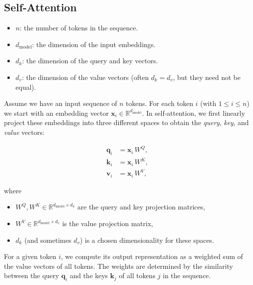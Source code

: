
\subsection{Self-Attention}

\begin{itemize}
	\item \( n \): the number of tokens in the sequence.
	\item \( d_{\text{model}} \): the dimension of the input embeddings.
	\item \( d_k \): the dimension of the query and key vectors.
	\item \( d_v \): the dimension of the value vectors (often \( d_k = d_v \), but they need not be equal).
\end{itemize}

Assume we have an input sequence of \( n \) tokens. For each token \( i \) (with \( 1 \leq i \leq n \)) we start with an embedding vector \( \mathbf{x}_i \in \mathbb{R}^{d_{\text{model}}} \). In self‐attention, we first linearly project these embeddings into three different spaces to obtain the \textit{query}, \textit{key}, and \textit{value} vectors:

\[
\begin{aligned}
\mathbf{q}_i &= \mathbf{x}_i \, W^Q, \\
\mathbf{k}_i &= \mathbf{x}_i \, W^K, \\
\mathbf{v}_i &= \mathbf{x}_i \, W^V,
\end{aligned}
\]

where
\begin{itemize}
	\item \( W^Q, W^K \in \mathbb{R}^{d_{\text{model}} \times d_k} \) are the query and key projection matrices,
	\item \( W^V \in \mathbb{R}^{d_{\text{model}} \times d_v} \) is the value projection matrix,
	\item \( d_k \) (and sometimes \( d_v \)) is a chosen dimensionality for these spaces.
\end{itemize}

For a given token \( i \), we compute its output representation as a weighted sum of the value vectors of all tokens. The weights are determined by the similarity between the query \( \mathbf{q}_i \) and the keys \( \mathbf{k}_j \) of all tokens \( j \) in the sequence.

